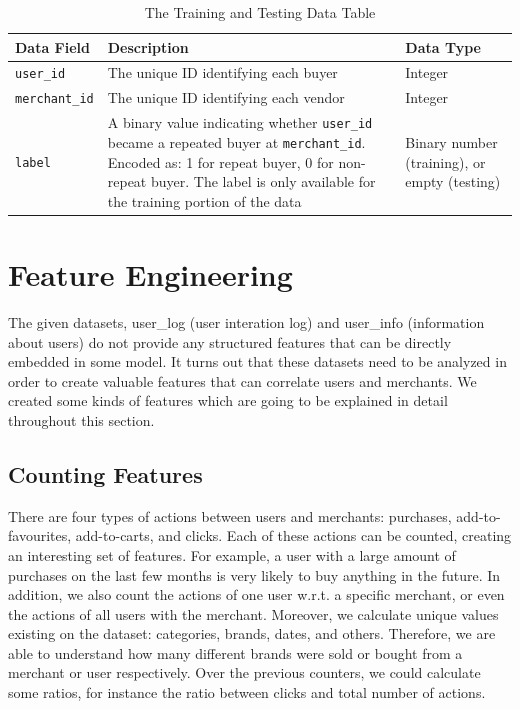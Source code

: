 \documentclass{article}
\begin{document}
\begin{table}[htbp]
    \centering
    \setlength{\extrarowheight}{3pt}
    \begin{tabular}{|p{20mm}|p{75mm}|p{31mm}|}
        \hline
        \textbf{Data Field} & \textbf{Description} & \textbf{Data Type} \\
        \hline
        \texttt{user\_id} & The unique ID identifying each buyer & Integer \\
        \hline
        \texttt{merchant\_id} & The unique ID identifying each vendor & Integer \\
        \hline
        \texttt{label} & A binary value indicating whether \texttt{user\_id} became a repeated buyer at \texttt{merchant\_id}. Encoded as: 1 for repeat buyer, 0 for non-repeat buyer. The label is only available for the training portion of the data & Binary number (training), or empty (testing) \\
        \hline
    \end{tabular}
    \vspace{0.3cm}
    \caption{The Training and Testing Data Table}
    \label{tab:training_testing}
\end{table}

\vspace{1.5cm}

\section{Feature Engineering}\label{feature_engineering_section}
The given datasets, user\_log (user interation log) and user\_info (information about users) do not provide any structured features that can be directly embedded in some model. It turns out that these datasets need to be analyzed in order to create valuable features that can correlate users and merchants. We created some kinds of features which are going to be explained in detail throughout this section.

\subsection{Counting Features}
There are four types of actions between users and merchants: purchases, add-to-favourites, add-to-carts, and clicks. Each of these actions can be counted, creating an interesting set of features. For example, a user with a large amount of purchases on the last few months is very likely to buy anything in the future. In addition, we also count the actions of one user w.r.t. a specific merchant, or even the actions of all users with the merchant. Moreover, we calculate unique values existing on the dataset: categories, brands, dates, and others. Therefore, we are able to understand how many different brands were sold or bought from a merchant or user respectively. Over the previous counters, we could calculate some ratios, for instance the ratio between clicks and total number of actions.
\end{document}
